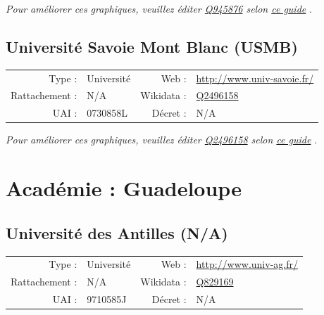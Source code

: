 \documentclass[12pt,french,landscape]{article}
\begin{document}
\textit{\scriptsize Pour améliorer ces graphiques, veuillez éditer \href{https://www.wikidata.org/entity/Q945876}{Q945876}  selon \href{https://github.com/cpesr/wikidataESR/blob/master/Rmd/wikidataESR.md}{ce guide}}
.


\newpage

\hypertarget{universituxe9-savoie-mont-blanc-usmb}{%
\subsection{Université Savoie Mont Blanc
(USMB)}\label{universituxe9-savoie-mont-blanc-usmb}}

\begin{tabular*}{0.45\textwidth}{rp{2cm}rl}  
\hline  
Type : & Université & Web : &\href{http://www.univ-savoie.fr/}{http://www.univ-savoie.fr/} \\  
Rattachement : & N/A & Wikidata : & \href{https://www.wikidata.org/entity/Q2496158}{Q2496158} \\  
UAI : & 0730858L & Décret : & N/A \\  
\hline  
\end{tabular*}

\textit{\scriptsize Pour améliorer ces graphiques, veuillez éditer \href{https://www.wikidata.org/entity/Q2496158}{Q2496158}  selon \href{https://github.com/cpesr/wikidataESR/blob/master/Rmd/wikidataESR.md}{ce guide}}
.


\newpage

\hypertarget{acaduxe9mie-guadeloupe}{%
\section{Académie : Guadeloupe}\label{acaduxe9mie-guadeloupe}}

\hypertarget{universituxe9-des-antilles-na}{%
\subsection{Université des Antilles
(N/A)}\label{universituxe9-des-antilles-na}}

\begin{tabular*}{0.45\textwidth}{rp{2cm}rl}  
\hline  
Type : & Université & Web : &\href{http://www.univ-ag.fr/}{http://www.univ-ag.fr/} \\  
Rattachement : & N/A & Wikidata : & \href{https://www.wikidata.org/entity/Q829169}{Q829169} \\  
UAI : & 9710585J & Décret : & N/A \\  
\hline  
\end{tabular*}
\end{document}
